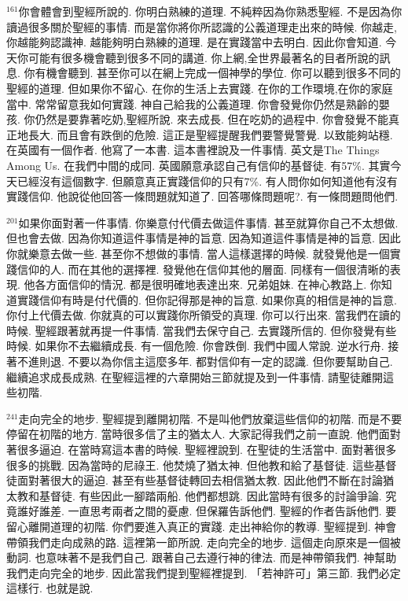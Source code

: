 \documentclass{book}
\begin{document}
$^{161}$你會體會到聖經所說的.
你明白熟練的道理.
不純粹因為你熟悉聖經.
不是因為你讀過很多關於聖經的事情.
而是當你將你所認識的公義道理走出來的時候.
你越走,你越能夠認識神.
越能夠明白熟練的道理.
是在實踐當中去明白.
因此你會知道.
今天你可能有很多機會聽到很多不同的講道.
你上網,全世界最著名的目者所說的訊息.
你有機會聽到.
甚至你可以在網上完成一個神學的學位.
你可以聽到很多不同的聖經的道理.
但如果你不留心.
在你的生活上去實踐.
在你的工作環境,在你的家庭當中.
常常留意我如何實踐.
神自己給我的公義道理.
你會發覺你仍然是熟齡的嬰孩.
你仍然是要靠著吃奶,聖經所說.
來去成長.
但在吃奶的過程中.
你會發覺不能真正地長大.
而且會有跌倒的危險.
這正是聖經提醒我們要警覺警覺.
以致能夠站穩.
在英國有一個作者.
他寫了一本書.
這本書裡說及一件事情.
英文是The Things Among Us.
在我們中間的成同.
英國願意承認自己有信仰的基督徒.
有57\%.
其實今天已經沒有這個數字.
但願意真正實踐信仰的只有7\%.
有人問你如何知道他有沒有實踐信仰.
他說從他回答一條問題就知道了.
回答哪條問題呢?.
有一條問題問他們.

$^{201}$如果你面對著一件事情.
你樂意付代價去做這件事情.
甚至就算你自己不太想做.
但也會去做.
因為你知道這件事情是神的旨意.
因為知道這件事情是神的旨意.
因此你就樂意去做一些.
甚至你不想做的事情.
當人這樣選擇的時候.
就發覺他是一個實踐信仰的人.
而在其他的選擇裡.
發覺他在信仰其他的層面.
同樣有一個很清晰的表現.
他各方面信仰的情況.
都是很明確地表達出來.
兄弟姐妹.
在神心教路上.
你知道實踐信仰有時是付代價的.
但你記得那是神的旨意.
如果你真的相信是神的旨意.
你付上代價去做.
你就真的可以實踐你所領受的真理.
你可以行出來.
當我們在讀的時候.
聖經跟著就再提一件事情.
當我們去保守自己.
去實踐所信的.
但你發覺有些時候.
如果你不去繼續成長.
有一個危險.
你會跌倒.
我們中國人常說.
逆水行舟.
接著不進則退.
不要以為你信主這麼多年.
都對信仰有一定的認識.
但你要幫助自己.
繼續追求成長成熟.
在聖經這裡的六章開始三節就提及到一件事情.
請聖徒離開這些初階.

$^{241}$走向完全的地步.
聖經提到離開初階.
不是叫他們放棄這些信仰的初階.
而是不要停留在初階的地方.
當時很多信了主的猶太人.
大家記得我們之前一直說.
他們面對著很多逼迫.
在當時寫這本書的時候.
聖經裡說到.
在聖徒的生活當中.
面對著很多很多的挑戰.
因為當時的尼祿王.
他焚燒了猶太神.
但他教和給了基督徒.
這些基督徒面對著很大的逼迫.
甚至有些基督徒轉回去相信猶太教.
因此他們不斷在討論猶太教和基督徒.
有些因此一腳踏兩船.
他們都想跳.
因此當時有很多的討論爭論.
究竟誰好誰差.
一直思考兩者之間的憂慮.
但保羅告訴他們.
聖經的作者告訴他們.
要留心離開道理的初階.
你們要進入真正的實踐.
走出神給你的教導.
聖經提到.
神會帶領我們走向成熟的路.
這裡第一節所說.
走向完全的地步.
這個走向原來是一個被動詞.
也意味著不是我們自己.
跟著自己去遵行神的律法.
而是神帶領我們.
神幫助我們走向完全的地步.
因此當我們提到聖經裡提到.
「若神許可」第三節.
我們必定這樣行.
也就是說.
\end{document}
